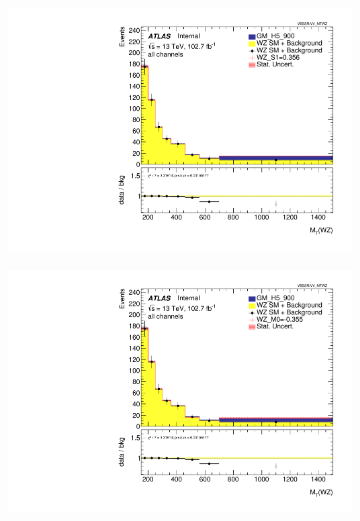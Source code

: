 \documentclass[../Bachelorarbeit.tex]{subfiles}
\begin{document}
\begin{figure}[h]

    \centering
    \begin{subfigure}{0.45\textwidth}
        \includegraphics[width=\textwidth]{Plots/ALL_MTWZ_right_color/GM_H5_900/S1/2022-05-07/VBSSR/all_VV_MTWZ.pdf}
    \end{subfigure}
    \begin{subfigure}{0.45\textwidth}
        \includegraphics[width=\textwidth]{Plots/ALL_MTWZ_right_color/GM_H5_900/M0/2022-05-07/VBSSR/all_VV_MTWZ.pdf}
    \end{subfigure}
    \begin{subfigure}{0.45\textwidth}

\end{subfigure}
\end{figure}
\end{document}
